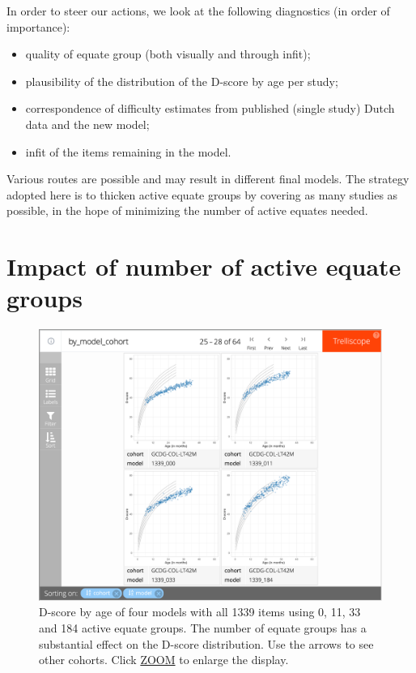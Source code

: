 \documentclass[
]{book}
\providecommand{\tightlist}{%
  \setlength{\itemsep}{0pt}\setlength{\parskip}{0pt}}
\begin{document}
In order to steer our actions, we look at the following diagnostics (in order of importance):

\begin{itemize}
\tightlist
\item
  quality of equate group (both visually and through infit);
\item
  plausibility of the distribution of the D-score by age per study;
\item
  correspondence of difficulty estimates from published (single study) Dutch data and the new model;
\item
  infit of the items remaining in the model.
\end{itemize}

Various routes are possible and may result in different final models. The strategy adopted here is to thicken active equate groups by covering as many studies as possible, in the hope of minimizing the number of active equates needed.

\hypertarget{sec:impactequate}{%
\section{Impact of number of active equate groups}\label{sec:impactequate}}

\begin{figure}

{\centering \includegraphics[width=1\linewidth]{fig/fig_5.2} 

}

\caption{D-score by age of four models with all 1339 items using 0, 11, 33 and 184 active equate groups. The number of equate groups has a substantial effect on the D-score distribution. Use the arrows to see other cohorts. Click \href{https://d-score.org/dbook-apps/models1339/\#display=by_model_cohort\&nrow=2\&ncol=2\&arr=row\&pg=7\&labels=cohort,model\&sort=cohort;asc,model;asc\&filter=\&sidebar=\&fv=}{ZOOM} to enlarge the display.}\label{fig:model1339}
\end{figure}
\end{document}

